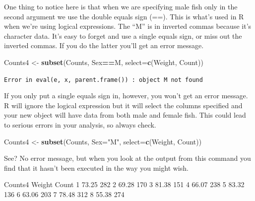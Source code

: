 \documentclass[
]{book}
\newenvironment{Shaded}{\begin{snugshade}}{\end{snugshade}}
\newcommand{\DataTypeTok}[1]{\textcolor[rgb]{0.13,0.29,0.53}{#1}}
\newcommand{\DecValTok}[1]{\textcolor[rgb]{0.00,0.00,0.81}{#1}}
\newcommand{\FloatTok}[1]{\textcolor[rgb]{0.00,0.00,0.81}{#1}}
\newcommand{\KeywordTok}[1]{\textcolor[rgb]{0.13,0.29,0.53}{\textbf{#1}}}
\newcommand{\NormalTok}[1]{#1}
\newcommand{\OperatorTok}[1]{\textcolor[rgb]{0.81,0.36,0.00}{\textbf{#1}}}
\newcommand{\StringTok}[1]{\textcolor[rgb]{0.31,0.60,0.02}{#1}}
\begin{document}
One thing to notice here is that when we are specifying male fish only in the second argument we use the double equals sign (==). This is what's used in R when we're using logical expressions. The ``M'' is in inverted commas because it's character data. It's easy to forget and use a single equals sign, or miss out the inverted commas. If you do the latter you'll get an error message.

\begin{Shaded}
\begin{Highlighting}[]
\NormalTok{Counts4 <-}\StringTok{ }\KeywordTok{subset}\NormalTok{(Counts, Sex}\OperatorTok{==}\NormalTok{M, }\DataTypeTok{select=}\KeywordTok{c}\NormalTok{(Weight, Count))}
\end{Highlighting}
\end{Shaded}

\texttt{Error\ in\ eval(e,\ x,\ parent.frame())\ :\ object\ \textquotesingle{}M\textquotesingle{}\ not\ found}

If you only put a single equals sign in, however, you won't get an error message. R will ignore the logical expression but it will select the columns specified and your new object will have data from both male and female fish. This could lead to serious errors in your analysis, so always check.

\begin{Shaded}
\begin{Highlighting}[]
\NormalTok{Counts4 <-}\StringTok{ }\KeywordTok{subset}\NormalTok{(Counts, }\DataTypeTok{Sex=}\StringTok{"M"}\NormalTok{, }\DataTypeTok{select=}\KeywordTok{c}\NormalTok{(Weight, Count))}
\end{Highlighting}
\end{Shaded}

See? No error message, but when you look at the output from this command you find that it hasn't been executed in the way you might wish.

\begin{Shaded}
\begin{Highlighting}[]
\NormalTok{Counts4}
\NormalTok{  Weight Count}
\DecValTok{1}  \FloatTok{73.25}   \DecValTok{282}
\DecValTok{2}  \FloatTok{69.28}   \DecValTok{170}
\DecValTok{3}  \FloatTok{81.38}   \DecValTok{151}
\DecValTok{4}  \FloatTok{66.07}   \DecValTok{238}
\DecValTok{5}  \FloatTok{83.32}   \DecValTok{136}
\DecValTok{6}  \FloatTok{63.06}   \DecValTok{203}
\DecValTok{7}  \FloatTok{78.48}   \DecValTok{312}
\DecValTok{8}  \FloatTok{55.38}   \DecValTok{274}
\end{Highlighting}
\end{Shaded}
\end{document}
